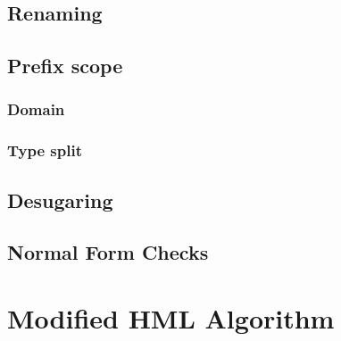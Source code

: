 \subsection{Renaming}
\subsection{Prefix scope}
\subsubsection{Domain}
\subsubsection{Type split}
\subsection{Desugaring}
\subsection{Normal Form Checks}
\section{Modified HML Algorithm}
